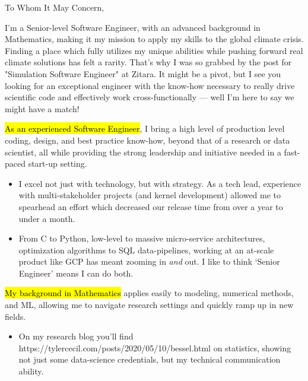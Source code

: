 \documentclass{tc_cv}
\begin{document}

\begin{adjustwidth}{38pt}{38pt}
  \large

  To Whom It May Concern,\par \medbreak

  \medbreak

  I'm a Senior-level Software Engineer, with an advanced background in
  Mathematics, making it my mission to apply my skills to the global climate
  crisis. Finding a place which fully utilizes my unique abilities while
  pushing forward real climate solutions has felt a rarity. That's why I was so
  grabbed by the post for "Simulation Software Engineer" at Zitara. It might be
  a pivot, but I see you looking for an exceptional engineer with the know-how
  necessary to really drive scientific code and effectively work
  cross-functionally --- well I'm here to say we might have a match! \medbreak

  \hl{As an experienced Software Engineer}, I bring a high level of production
  level coding, design, and best practice know-how, beyond that of a research
  or data scientist, all while providing the strong leadership and initiative
  needed in a fast-paced start-up setting.
  \begin{itemize}

    \item I excel not just with technology, but with strategy. As a tech lead,
      experience with multi-stakeholder projects (and kernel development)
      allowed me to spearhead an effort which decreased our release time from
      over a year to under a month.

    \item From C to Python, low-level to massive micro-service architectures,
      optimization algorithms to SQL data-pipelines, working at an at-scale
      product like GCP has meant zooming in \emph{and} out. I like to think
      `Senior Engineer' means I can do both.

  \end{itemize} \medbreak

  \hl{My background in Mathematics} applies easily to modeling, numerical
  methods, and ML, allowing me to navigate research settings and quickly ramp
  up in new fields.
  \begin{itemize}

    \item On my research blog you'll find \cite{Jupyter
      notebooks}{https://tylercecil.com/posts/2020/05/10/bessel.html} on
      statistics, showing not just some data-science credentials, but my
      technical communication ability.


\end{itemize}
\end{adjustwidth}
\end{document}
